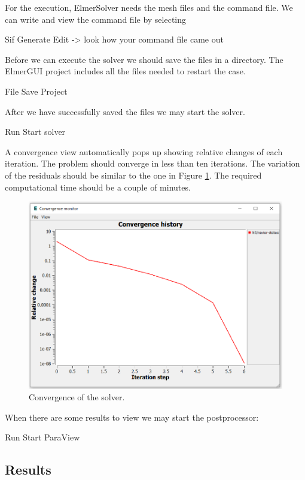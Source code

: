For the execution, ElmerSolver needs the mesh files and the command file.  We can write and view the command file by selecting

\ttbegin
Sif 
  Generate
  Edit -> look how your command file came out  
\ttend

Before we can execute the solver we should save the files in a directory.  The ElmerGUI project includes all the files needed to restart the case.

\ttbegin
File 
  Save Project
\ttend

After we have successfully saved the files we may start the solver.

\ttbegin
Run
  Start solver
\ttend

A convergence view automatically pops up showing relative changes of each iteration. The problem should converge in less than ten iterations.
The variation of the residuals should be similar to the one in Figure \ref{fg:DC_convergence}. The required computational time should be a couple of minutes.

\begin{figure}[H]
\centering
\includegraphics[scale=0.5]{DC_convergence}
\caption{Convergence of the solver.}\label{fg:DC_convergence}
\end{figure} 

When there are some results to view we may start the postprocessor:

\ttbegin
Run
  Start ParaView
\ttend

\subsection*{Results}


